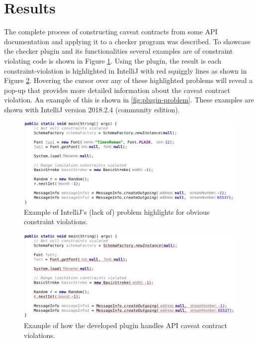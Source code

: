 \section{Results}
\label{sec:contract-results}
The complete process of constructing caveat contracts from some API documentation and applying it to a checker program was described. To showcase the checker plugin and its functionalities several examples are of constraint violating code is shown in Figure \ref{fig:plugin-inspection-off}. Using the plugin, the result is each constraint-violation is highlighted in IntelliJ with red squiggly lines as shown in Figure \ref{fig:plugin-inspection-on}. Hovering the cursor over any of these highlighted problems will reveal a pop-up that provides more detailed information about the caveat contract violation. An example of this is shown in \ref{fig:plugin-problem}. These examples are shown with IntelliJ version 2018.2.4 (community edition).

\begin{figure}[h]
	\label{fig:plugin-inspection-off}
	\centering
	\includegraphics[width=\textwidth]{figs/plugin-inspection-off.png}
	\caption{Example of IntelliJ's (lack of) problem highlights for obvious constraint violations.}
\end{figure}

\begin{figure}[h]
	\label{fig:plugin-inspection-on}
	\centering
	\includegraphics[width=\textwidth]{figs/plugin-inspection-on.png}
	\caption{Example of how the developed plugin handles API caveat contract violations.}
\end{figure}

